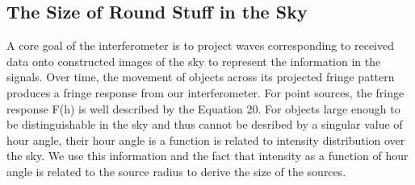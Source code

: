 \documentclass{article}
\begin{document}
\subsection{The Size of Round Stuff in the Sky}
A core goal of the interferometer is to project waves corresponding to
received data onto constructed images of the sky to represent the
information in the signals. Over time, the movement of objects across
its projected fringe pattern produces a fringe response from our
interferometer. For point sources, the fringe response F(h) is well
described by the Equation 20. For objects large enough to be
distinguishable in the sky and thus cannot be desribed by a singular
value of hour angle, their hour angle is a function is related to
intensity distribution over the sky. We use this information and the
fact that intensity as a function of hour angle is related to the source
radius to derive the size of the sources. 
\end{document}
